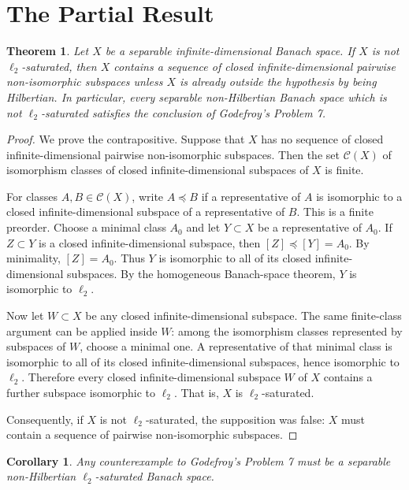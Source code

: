 \documentclass[11pt]{article}
\newtheorem{theorem}{Theorem}
\newtheorem{corollary}{Corollary}
\begin{document}
\section*{The Partial Result}

\begin{theorem}
Let \(X\) be a separable infinite-dimensional Banach space. If \(X\) is not
\(\ell_2\)-saturated, then \(X\) contains a sequence of closed
infinite-dimensional pairwise non-isomorphic subspaces unless \(X\) is already
outside the hypothesis by being Hilbertian. In particular, every separable
non-Hilbertian Banach space which is not \(\ell_2\)-saturated satisfies the
conclusion of Godefroy's Problem 7.
\end{theorem}

\begin{proof}
We prove the contrapositive. Suppose that \(X\) has no sequence of closed
infinite-dimensional pairwise non-isomorphic subspaces. Then the set
\(\mathcal C(X)\) of isomorphism classes of closed infinite-dimensional
subspaces of \(X\) is finite.

For classes \(A,B\in\mathcal C(X)\), write \(A\preceq B\) if a representative
of \(A\) is isomorphic to a closed infinite-dimensional subspace of a
representative of \(B\). This is a finite preorder. Choose a minimal class
\(A_0\) and let \(Y\subset X\) be a representative of \(A_0\). If \(Z\subset Y\)
is a closed infinite-dimensional subspace, then \([Z]\preceq [Y]=A_0\). By
minimality, \([Z]=A_0\). Thus \(Y\) is isomorphic to all of its closed
infinite-dimensional subspaces. By the homogeneous Banach-space theorem,
\(Y\) is isomorphic to \(\ell_2\).

Now let \(W\subset X\) be any closed infinite-dimensional subspace. The same
finite-class argument can be applied inside \(W\): among the isomorphism
classes represented by subspaces of \(W\), choose a minimal one. A representative
of that minimal class is isomorphic to all of its closed infinite-dimensional
subspaces, hence isomorphic to \(\ell_2\). Therefore every closed
infinite-dimensional subspace \(W\) of \(X\) contains a further subspace
isomorphic to \(\ell_2\). That is, \(X\) is \(\ell_2\)-saturated.

Consequently, if \(X\) is not \(\ell_2\)-saturated, the supposition was false:
\(X\) must contain a sequence of pairwise non-isomorphic subspaces.
\end{proof}

\begin{corollary}
Any counterexample to Godefroy's Problem 7 must be a separable non-Hilbertian
\(\ell_2\)-saturated Banach space.
\end{corollary}
\end{document}
